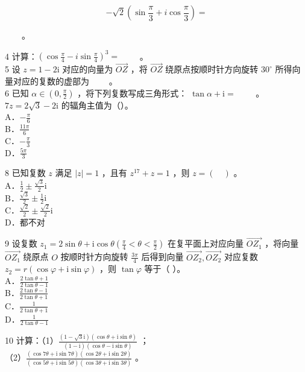 \documentclass[10pt]{article}
\begin{document}
\[
-\sqrt{2}\left(\sin \frac{\pi}{3}+i \cos \frac{\pi}{3}\right)=
\]

\(\qquad\)。

4 计算：\(\left(\cos \frac{\pi}{4}-i \sin \frac{\pi}{4}\right)^{3}=\) \(\qquad\)。\\
5 设 \(z=1-2 \mathrm{i}\) 对应的向量为 \(\overrightarrow{O Z}\) ，将 \(\overrightarrow{O Z}\) 绕原点按顺时针方向旋转 \(30^{\circ}\) 所得向量对应的复数的虚部为 \(\qquad\)。\\
6 已知 \(\alpha \in\left(0, \frac{\pi}{2}\right)\) ，将下列复数写成三角形式： \(\tan \alpha+\mathrm{i}=\) \(\qquad\)。\\
\(7 z=2 \sqrt{3}-2 \mathrm{i}\) 的辐角主值为（）。\\
A．\(-\frac{\pi}{6}\)\\
B．\(\frac{11 \pi}{6}\)\\
C．\(-\frac{\pi}{3}\)\\
D．\(\frac{5 \pi}{3}\)

8 已知复数 \(z\) 满足 \(|z|=1\) ，且有 \(z^{17}+z=1\) ，则 \(z=(\quad)\) 。\\
A．\(\frac{1}{2} \pm \frac{\sqrt{3}}{2} \mathrm{i}\)\\
B．\(\frac{\sqrt{3}}{2} \pm \frac{1}{2} \mathrm{i}\)\\
C．\(\frac{\sqrt{2}}{2} \pm \frac{\sqrt{2}}{2} \mathrm{i}\)\\
D．都不对

9 设复数 \(z_{1}=2 \sin \theta+\mathrm{i} \cos \theta\left(\frac{\pi}{4}<\theta<\frac{\pi}{2}\right)\) 在复平面上对应向量 \(\overrightarrow{O Z_{1}}\) ，将向量 \(\overrightarrow{O Z_{1}}\) 绕原点 \(O\) 按顺时针方向旋转 \(\frac{3 \pi}{4}\) 后得到向量 \(\overrightarrow{O Z_{2}}, \overrightarrow{O Z_{2}}\) 对应复数 \(z_{2}=r(\cos \varphi+\mathrm{i} \sin \varphi)\) ，则 \(\tan \varphi\) 等于（ ）。\\
A．\(\frac{2 \tan \theta+1}{2 \tan \theta-1}\)\\
B．\(\frac{2 \tan \theta-1}{2 \tan \theta+1}\)\\
C．\(\frac{1}{2 \tan \theta+1}\)\\
D．\(\frac{1}{2 \tan \theta-1}\)

10 计算：（1）\(\frac{(1-\sqrt{3} \mathrm{i})(\cos \theta+\mathrm{i} \sin \theta)}{(1-\mathrm{i})(\cos \theta-\mathrm{i} \sin \theta)}\) ；\\
（2）\(\frac{(\cos 7 \theta+\mathrm{i} \sin 7 \theta)(\cos 2 \theta+\mathrm{i} \sin 2 \theta)}{(\cos 5 \theta+\mathrm{i} \sin 5 \theta)(\cos 3 \theta+\mathrm{i} \sin 3 \theta)}\) 。
\end{document}
